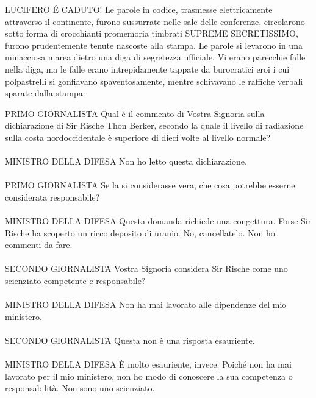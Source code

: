 	
	LUCIFERO É CADUTO! Le parole in codice, trasmesse elettricamente
	attraverso il continente, furono sussurrate nelle sale delle conferenze,
	circolarono sotto forma di crocchianti promemoria timbrati SUPREME
	SECRETISSIMO, furono prudentemente tenute nascoste alla stampa. Le
	parole si levarono in una minacciosa marea dietro una diga di segretezza
	ufficiale. Vi erano parecchie falle nella diga, ma le falle erano
	intrepidamente tappate da burocratici eroi i cui polpastrelli si
	gonfiavano spaventosamente, mentre schivavano le raffiche verbali
	sparate dalla stampa:
	
	{\begin{flushleft}
			PRIMO GIORNALISTA Qual è il commento di Vostra Signoria sulla
			dichiarazione di Sir Rische Thon Berker, secondo la quale il livello di
			radiazione sulla costa nordoccidentale è superiore di dieci volte al
			livello normale?
			\leavevmode\\
			\leavevmode\\
			MINISTRO DELLA DIFESA Non ho letto questa dichiarazione.
			\leavevmode\\
			\leavevmode\\
			PRIMO GIORNALISTA Se la si considerasse vera, che cosa potrebbe esserne
			considerata responsabile?
			\leavevmode\\
			\leavevmode\\
			MINISTRO DELLA DIFESA Questa domanda richiede una congettura. Forse Sir
			Rische ha scoperto un ricco deposito di uranio. No, cancellatelo. Non ho
			commenti da fare.
			\leavevmode\\
			\leavevmode\\
			SECONDO GIORNALISTA Vostra Signoria considera Sir Rische come uno
			scienziato competente e responsabile?
			\leavevmode\\
			\leavevmode\\
			MINISTRO DELLA DIFESA Non ha mai lavorato alle dipendenze del mio
			ministero.
			\leavevmode\\
			\leavevmode\\
			SECONDO GIORNALISTA Questa non è una risposta esauriente.
			\leavevmode\\
			\leavevmode\\
			MINISTRO DELLA DIFESA È molto esauriente, invece. Poiché non ha mai
			lavorato per il mio ministero, non ho modo di conoscere la sua
			competenza o responsabilità. Non sono uno scienziato.
			\leavevmode\\
			\leavevmode\\

\end{flushleft}}

